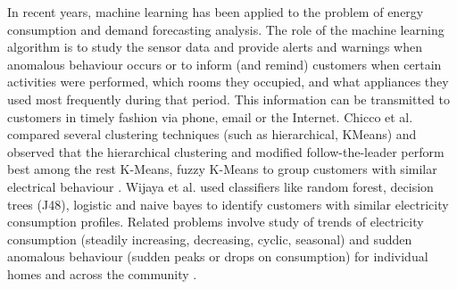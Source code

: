\documentclass[runningheads,a4paper]{llncs}
\begin{document}
In recent years, machine learning has been applied to the problem of energy consumption and demand forecasting analysis. The role of the machine learning algorithm is to study the sensor data and provide alerts and warnings when anomalous behaviour occurs or to inform (and remind) customers when certain activities were performed, which rooms they occupied, and what appliances they used most frequently during that period. This information can be transmitted to customers in timely fashion via phone, email or the Internet.
Chicco et al. \cite{1626400} compared several clustering techniques (such as hierarchical, KMeans) and observed that the hierarchical clustering and modified follow-the-leader perform best among the rest K-Means, fuzzy K-Means to group customers with similar electrical behaviour \cite{5620917}. Wijaya et al. \cite{Wijaya} used classifiers like random forest, decision trees (J48), logistic and naive bayes to identify customers with similar electricity consumption profiles.
Related problems involve study of trends of electricity consumption (steadily increasing, decreasing, cyclic, seasonal) and sudden anomalous behaviour (sudden peaks or drops on consumption) for individual homes and across the community \cite{Diane}.
\end{document}
